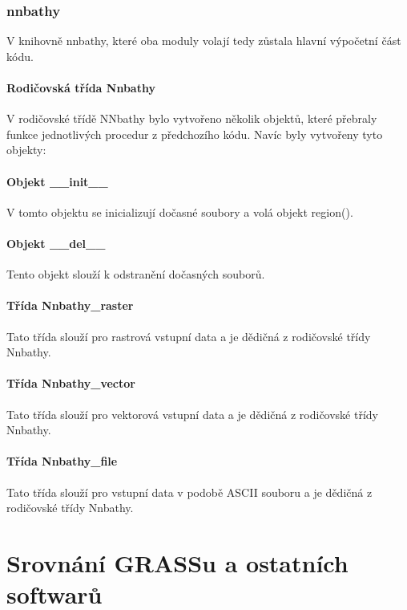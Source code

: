 \documentclass[12pt,a4paper]{article}
\begin{document}
\subsubsection{nnbathy}
V knihovně nnbathy, které oba moduly volají tedy zůstala hlavní výpočetní část kódu. 

\paragraph{Rodičovská třída Nnbathy} V rodičovské třídě NNbathy bylo vytvořeno několik objektů, které přebraly funkce jednotlivých procedur z předchozího kódu. Navíc byly vytvořeny tyto objekty:

\paragraph{Objekt \_\_init\_\_}
V tomto objektu se inicializují dočasné soubory a volá objekt region().


\paragraph{Objekt \_\_del\_\_}
Tento objekt slouží k odstranění dočasných souborů.

\paragraph{Třída Nnbathy\_raster}
Tato třída slouží pro rastrová vstupní data a je dědičná z rodičovské třídy Nnbathy.

\paragraph{Třída Nnbathy\_vector}
Tato třída slouží pro vektorová vstupní data a je dědičná z rodičovské třídy Nnbathy.

\paragraph{Třída Nnbathy\_file}
Tato třída slouží pro vstupní data v podobě ASCII souboru a je dědičná z rodičovské třídy Nnbathy.

\newpage
\section{Srovnání GRASSu a ostatních softwarů}
\end{document}
